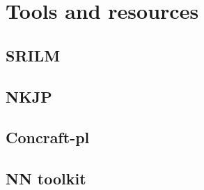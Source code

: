 \chapter{Tools and resources}
\label{chapter:tools}
\section{SRILM}
\section{NKJP}
\section{Concraft-pl}
\section{NN toolkit}




